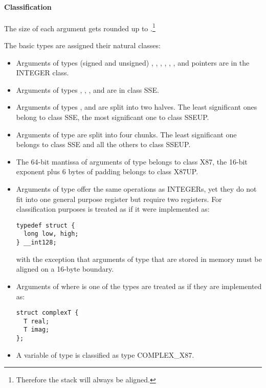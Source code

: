 \paragraph{Classification}
The size of each argument gets rounded up to
\eightbytes.\footnote{Therefore the stack will always be \eightbyte aligned.}

The basic types are assigned their natural classes:
\begin{itemize}
\item Arguments of types (signed and unsigned) , ,
  , , , , and
  pointers are in the INTEGER class.
\item Arguments of types , , ,
   and  are in class SSE.
\item Arguments of types , 
  and  are split into two halves.  The least significant
  ones belong to class SSE, the most significant one to class SSEUP.
\item Arguments of type  are split into four \eightbyte
  chunks.  The least significant one belongs to class SSE and all the
  others to class SSEUP.
\item The 64-bit mantissa of arguments of type 
  belongs to class X87, the 16-bit exponent plus 6 bytes of padding
  belongs to class X87UP.
\item Arguments of type  offer the same operations as
INTEGERs, yet they do not fit into one general purpose register but
require two registers.  For
classification purposes  is treated as if it
were implemented as:
\begin{verbatim}
typedef struct {
  long low, high;
} __int128;
\end{verbatim}
with the exception that arguments of type  that are
stored in memory must be aligned on a 16-byte boundary.

\item Arguments of  where  is one of the types
   are treated as if they are
  implemented as:
\begin{verbatim}
struct complexT {
  T real;
  T imag;
};
\end{verbatim}
\item A variable of type  is classified as
  type COMPLEX\_X87.
\end{itemize}


